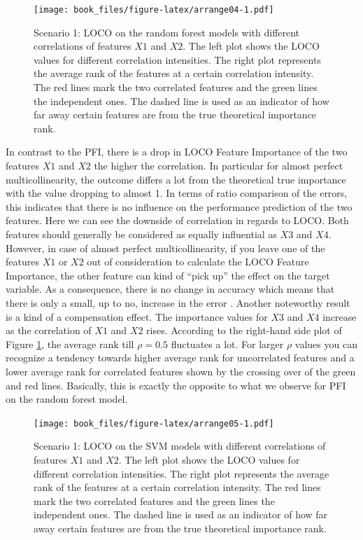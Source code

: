 \documentclass[
]{krantz}
\begin{document}
\begin{figure}
\centering
\texttt{[image: book\_files/figure-latex/arrange04-1.pdf]}
\caption{\label{fig:arrange04}Scenario 1: LOCO on the random forest models with different correlations of features \(X1\) and \(X2\). The left plot shows the LOCO values for different correlation intensities. The right plot represents the average rank of the features at a certain correlation intensity. The red lines mark the two correlated features and the green lines the independent ones. The dashed line is used as an indicator of how far away certain features are from the true theoretical importance rank.}
\end{figure}

In contrast to the PFI, there is a drop in LOCO Feature Importance of the two features \(X1\) and \(X2\) the higher the correlation. In particular for almost perfect multicollinearity, the outcome differs a lot from the theoretical true importance with the value dropping to almost 1. In terms of ratio comparison of the errors, this indicates that there is no influence on the performance prediction of the two features. Here we can see the downside of correlation in regards to LOCO. Both features should generally be considered as equally influential as \(X3\) and \(X4\). However, in case of almost perfect multicollinearity, if you leave one of the features \(X1\) or \(X2\) out of consideration to calculate the LOCO Feature Importance, the other feature can kind of ``pick up'' the effect on the target variable. As a consequence, there is no change in accuracy which means that there is only a small, up to no, increase in the error \citep{parr2018}. Another noteworthy result is a kind of a compensation effect. The importance values for \(X3\) and \(X4\) increase as the correlation of \(X1\) and \(X2\) rises. According to the right-hand side plot of Figure \ref{fig:arrange04}, the average rank till \(\rho = 0.5\) fluctuates a lot. For larger \(\rho\) values you can recognize a tendency towards higher average rank for uncorrelated features and a lower average rank for correlated features shown by the crossing over of the green and red lines. Basically, this is exactly the opposite to what we observe for PFI on the random forest model.

\begin{figure}
\centering
\texttt{[image: book\_files/figure-latex/arrange05-1.pdf]}
\caption{\label{fig:arrange05}Scenario 1: LOCO on the SVM models with different correlations of features \(X1\) and \(X2\). The left plot shows the LOCO values for different correlation intensities. The right plot represents the average rank of the features at a certain correlation intensity. The red lines mark the two correlated features and the green lines the independent ones. The dashed line is used as an indicator of how far away certain features are from the true theoretical importance rank.}
\end{figure}
\end{document}
